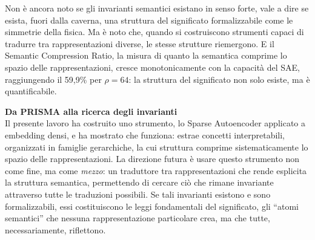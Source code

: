Non è ancora noto se gli invarianti semantici esistano in senso forte, vale a dire se esista, fuori dalla caverna, una struttura del significato formalizzabile come le simmetrie della fisica. Ma è noto che, quando si costruiscono strumenti capaci di tradurre tra rappresentazioni diverse, le stesse strutture riemergono. E il Semantic Compression Ratio, la misura di quanto la semantica comprime lo spazio delle rappresentazioni, cresce monotonicamente con la capacità del SAE, raggiungendo il 59,9\% per $\rho = 64$: la struttura del significato non solo esiste, ma è quantificabile.
\begin{notebox}
\textbf{Da PRISMA alla ricerca degli invarianti}\\[0.5em]
Il presente lavoro ha costruito uno strumento, lo Sparse Autoencoder applicato a embedding densi, e ha mostrato che funziona: estrae concetti interpretabili, organizzati in famiglie gerarchiche, la cui struttura comprime sistematicamente lo spazio delle rappresentazioni.
La direzione futura è usare questo strumento non come fine, ma come \textit{mezzo}: un traduttore tra rappresentazioni che rende esplicita la struttura semantica, permettendo di cercare ciò che rimane invariante attraverso tutte le traduzioni possibili.
Se tali invarianti esistono e sono formalizzabili, essi costituiscono le leggi fondamentali del significato, gli ``atomi semantici'' che nessuna rappresentazione particolare crea, ma che tutte, necessariamente, riflettono.
\end{notebox}